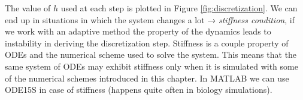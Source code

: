   The value of $h$ used at each step is plotted in Figure \ref{fig:discretization}. We can end up in situations in which the system changes a lot → \emph{stiffness condition}, if we work with an adaptive method the property of the dynamics leads to instability in deriving the discretization step.
  Stiffness is a couple property of ODEs and the numerical scheme used to solve the system.
  This means that the same system of ODEs may exhibit stiffness only when it is simulated with some of the numerical schemes introduced in this chapter.
  In MATLAB we can use ODE15S in case of stiffness (happens quite often in biology simulations).
